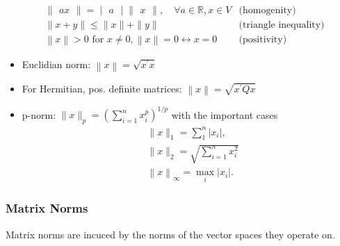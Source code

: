 \begin{align*}
     & \begin{Vmatrix}ax\end{Vmatrix}  =\begin{vmatrix}a\end{vmatrix}\begin{Vmatrix}x\end{Vmatrix},\quad\forall a\in\mathbb{R},x\in V & \text{(homogenity)}          \\
     & \|x+y\|                         \leq\|x\|+\|y\|                                                                                & \text{(triangle inequality)} \\
     & \left\|x\right\|                >0 \text{ for } x\neq0, \left\|x\right\|=0\leftrightarrow x=0                                  & \text{(positivity)}
\end{align*}

\begin{itemize}
    \item Euclidian norm: $\left\|x\right\|=\sqrt{x^{\prime}x}$
    \item For Hermitian, pos. definite matrices: $\left\|x\right\|=\sqrt{x^{\prime}Qx}$
    \item p-norm: $\|x\|_p=\left(\sum_{i=1}^nx_i^p\right)^{1/p}$ with the important cases
          \begin{align*}
               & \|x\|_1=\sum_1^n\left|x_i\right|,               \\
               & \|x\|_2=\sqrt{\sum_{i=1}^nx_i^2}                \\
               & \left\|x\right\|_\infty=\max_i\left|x_i\right|.
          \end{align*}
\end{itemize}

\subsubsection{Matrix Norms}



Matrix norms are incuced by the norms of the vector spaces they operate on.




